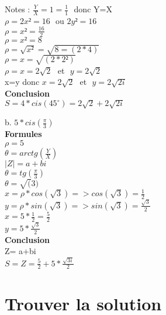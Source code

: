 Notes : $\frac{Y}{X} = 1 = \frac{1}{1}$ $ $ donc Y=X \\

$\rho = 2x² = 16$ $ $ ou $ 2y² = 16$ \\
$\rho = x² = \frac{16}{2}$ \\
$\rho = x² = 8$ \\
$\rho = \sqrt{x²} = \sqrt{8 = (2*4)}$ \\
$\rho = x = \sqrt{(2*2²)}$ \\
$\rho = x = 2\sqrt{2}$ $ $ et $ $ $ y=2\sqrt{2} $\\

x=y donc $x = 2\sqrt{2}$ $ $ et $ $ $ y=2\sqrt{2i} $ \\

\textbf{Conclusion}\\

$ S= 4 * cis(45^{\circ}) = 2\sqrt{2} + 2\sqrt{2i}$

\newpage

b. $5 * cis(\frac{\pi}{3})$ \\

\textbf{Formules} \\

$\rho = 5 $\\
$\theta = arctg(\frac{Y}{X})$ \\
$|Z| = a+bi $\\

\vspace{3mm} %
$\theta = tg(\frac{\pi}{3})$\\
$\theta = \sqrt(3)$\\

$x= \rho * cos(\sqrt{3}) => cos(\sqrt{3}) = \frac{1}{2}$ \\
$y= \rho * sin(\sqrt{3}) => sin(\sqrt{3}) = \frac{\sqrt{3}}{2}$ \\

$x= 5*\frac{1}{2} = \frac{5}{2}$ \\
$y= 5*\frac{\sqrt{3}}{2}$ \\

\textbf{Conclusion} \\

Z= a+bi \\

$ S= Z=\frac{5}{2} + 5*\frac{\sqrt{3i}} {2}$

\newpage

\vspace{3mm} %
\section{Trouver la solution}
\vspace{3mm} %

